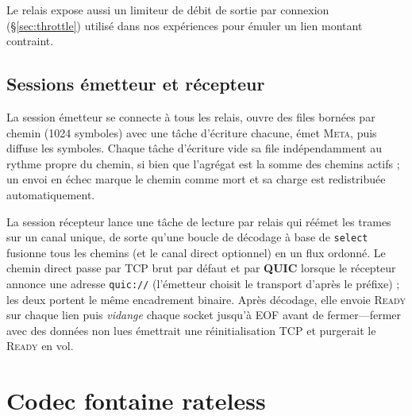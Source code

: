 \documentclass[conference]{IEEEtran}
\begin{document}
Le relais expose aussi un limiteur de débit de sortie par connexion
(\S\ref{sec:throttle}) utilisé dans nos expériences pour émuler un lien montant
contraint.

\subsection{Sessions émetteur et récepteur}
La session émetteur se connecte à tous les relais, ouvre des files bornées par
chemin (1024 symboles) avec une tâche d'écriture chacune, émet \textsc{Meta},
puis diffuse les symboles. Chaque tâche d'écriture vide sa file
indépendamment au rythme propre du chemin, si bien que l'agrégat est la somme
des chemins actifs ; un envoi en échec marque le chemin comme mort et sa charge
est redistribuée automatiquement.

La session récepteur lance une tâche de lecture par relais qui réémet les
trames sur un canal unique, de sorte qu'une boucle de décodage à base de
\texttt{select} fusionne tous les chemins (et le canal direct optionnel) en un
flux ordonné. Le chemin direct passe par TCP brut par défaut et par
\textbf{QUIC} lorsque le récepteur annonce une adresse \texttt{quic://}
(l'émetteur choisit le transport d'après le préfixe) ; les deux portent le même
encadrement binaire. Après décodage, elle envoie \textsc{Ready} sur chaque lien
puis \emph{vidange} chaque socket jusqu'à EOF avant de fermer---fermer avec des
données non lues émettrait une réinitialisation TCP et purgerait le
\textsc{Ready} en vol.

\section{Codec fontaine rateless}
\label{sec:codec}
\end{document}
